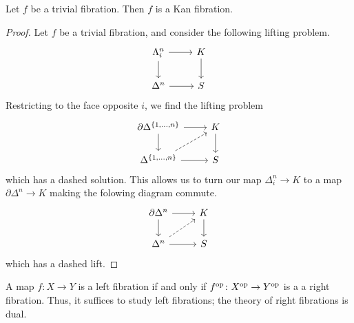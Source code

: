 \documentclass[main.tex]{subfiles}
\begin{document}
\begin{theorem}
  Let $f$ be a trivial fibration. Then $f$ is a Kan fibration.
\end{theorem}
\begin{proof}
  Let $f$ be a trivial fibration, and consider the following lifting problem.
  \begin{equation*}
    \begin{tikzcd}
      \Lambda^{n}_{i}
      \arrow[r]
      \arrow[d]
      & K
      \arrow[d]
      \\
      \Delta^{n}
      \arrow[r]
      & S
    \end{tikzcd}
  \end{equation*}
  Restricting to the face opposite $i$, we find the lifting problem
  \begin{equation*}
    \begin{tikzcd}
      \partial \Delta^{\{1, \ldots, n\}}
      \arrow[r]
      \arrow[d]
      & K
      \arrow[d]
      \\
      \Delta^{\{1, \ldots, n\}}
      \arrow[r]
      \arrow[ur, dashed]
      & S
    \end{tikzcd}
  \end{equation*}
  which has a dashed solution. This allows us to turn our map $\Delta^{n}_{i} \to K$ to a map $\partial \Delta^{n} \to K$ making the folowing diagram commute.
  \begin{equation*}
    \begin{tikzcd}
      \partial \Delta^{n}
      \arrow[r]
      \arrow[d]
      & K
      \arrow[d]
      \\
      \Delta^{n}
      \arrow[r]
      \arrow[ur, dashed]
      & S
    \end{tikzcd}
  \end{equation*}
  which has a dashed lift.
\end{proof}

\begin{note}
  A map $f\colon X \to Y$ is a left fibration if and only if $f^{\mathrm{op}}\colon X^{\mathrm{op}} \to Y^{\mathrm{op}}$ is a a right fibration. Thus, it suffices to study left fibrations; the theory of right fibrations is dual.
\end{note}
\end{document}
